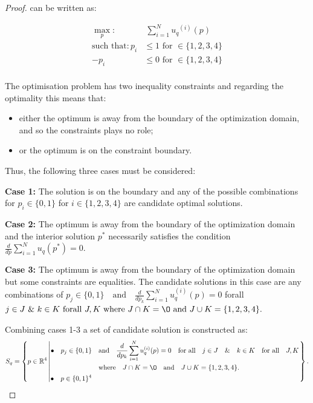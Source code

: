 \documentclass[10pt]{article}
\begin{document}
\begin{proof}
    can be written as:

    \begin{equation}\label{eq:mo_tournament_optimisation_standard}
        \begin{aligned}
        \max_p: & \ \sum_{i=1} ^ {N} {u_q}^{(i)} (p)
        \\
        \text{such that}: p_i & \leq 1 \text{ for } \in \{1, 2, 3, 4\} \\
        - p_i & \leq 0 \text{ for } \in \{1, 2, 3, 4\} \\
        \end{aligned}
    \end{equation}
    
    The optimisation problem has two inequality constraints and regarding the optimality
    this means that:
    
    \begin{itemize}
        \item either the optimum is away from the boundary of the optimization domain, and so the constraints plays no role;
        \item or the optimum is on the constraint boundary.
    \end{itemize}
    
    Thus, the following three cases must be considered:
    
    \textbf{Case 1:} The solution is on the boundary and any of the possible
    combinations for $p_i \in \{0, 1\}$ for $i \in \{1, 2, 3, 4\}$ are candidate
    optimal solutions.
    
    \textbf{Case 2:} The optimum is away from the boundary of the optimization domain
    and the interior solution $p^*$ necessarily satisfies the condition
    \(\frac{d}{dp} \sum\limits_{i=1} ^ N  u_q(p^*) = 0\).
    
    \textbf{Case 3:} The optimum is away from the boundary of the optimization domain
    but some constraints are equalities. The candidate solutions in this case
    are any combinations of $p_j \in \{0, 1\} \quad \text{and} \quad \frac{d}{dp_k} 
    \sum\limits_{i=1} ^ N  u_q^{(i)}(p) = 0$ 
    forall $ j \in J \text{ \& } k \in K \text{ forall } J, K
    \text{ where } J \cap K = \O \text{ and } J \cup K = \{1, 2, 3, 4\}.$
    
    Combining cases 1-3 a set of candidate solution is constructed as:
    {\scriptsize
    \begin{equation*}
        S_q =
        \left\{p \in \mathbb{R} ^ 4 \left|
            \begin{aligned}
                \bullet\quad p_j \in \{0, 1\} & \quad \text{and} \quad \frac{d}{dp_k} 
                \sum\limits_{i=1} ^ N  u_q^{(i)}(p) = 0
                \quad \text{for all} \quad j \in J \quad \&  \quad k \in K  \quad \text{for all} \quad J, K \\
                & \quad \text{where} \quad J \cap K = \O \quad
                \text{and} \quad J \cup K = \{1, 2, 3, 4\}.\\
                \bullet\quad  p \in \{0, 1\} ^ 4
            \end{aligned}\right.
        \right\}.
    \end{equation*}}
    

\end{proof}
\end{document}

